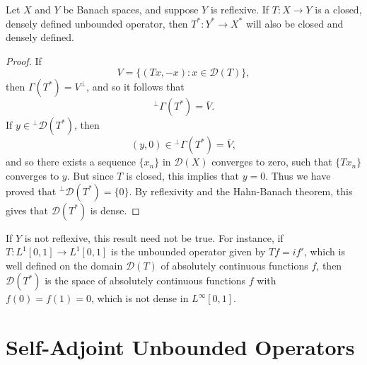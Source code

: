 %
%

\begin{lemma}
    Let $X$ and $Y$ be Banach spaces, and suppose $Y$ is reflexive. If $T: X \to Y$ is a closed, densely defined unbounded operator, then $T^*: Y^* \to X^*$ will also be closed and densely defined.
\end{lemma}
\begin{proof}
    If
    \[ V = \{ (Tx,-x): x \in \mathcal{D}(T) \}, \]
    then $\Gamma(T^*) = V^\perp$, and so it follows that
    \[ {}^\perp \Gamma(T^*) = \overline{V}. \]
    If $y \in {}^\perp \mathcal{D}(T^*)$, then
    \[ (y,0) \in {}^\perp \Gamma(T^*) = \overline{V}, \]
    and so there exists a sequence $\{ x_n \}$ in $\mathcal{D}(X)$ converges to zero, such that $\{ Tx_n \}$ converges to $y$. But since $T$ is closed, this implies that $y = 0$. Thus we have proved that ${}^\perp \mathcal{D}(T^*) = \{ 0 \}$. By reflexivity and the Hahn-Banach theorem, this gives that $\mathcal{D}(T^*)$ is dense.
\end{proof}

\begin{remark}
    If $Y$ is not reflexive, this result need not be true. For instance, if $T: L^1[0,1] \to L^1[0,1]$ is the unbounded operator given by $Tf = if'$, which is well defined on the domain $\mathcal{D}(T)$ of absolutely continuous functions $f$, then $\mathcal{D}(T^*)$ is the space of absolutely continuous functions $f$ with $f(0) = f(1) = 0$, which is not dense in $L^\infty[0,1]$.
\end{remark}








\section{Self-Adjoint Unbounded Operators}

